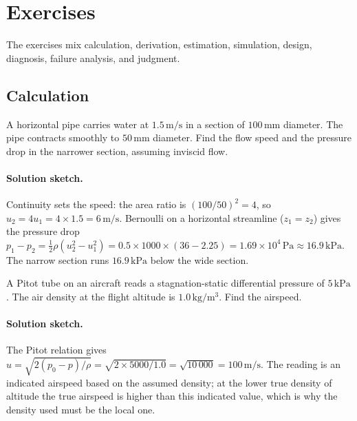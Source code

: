 \section{Exercises}

The exercises mix calculation, derivation, estimation, simulation,
design, diagnosis, failure analysis, and judgment.

\subsection*{Calculation}

\begin{exercise}
A horizontal pipe carries water at $1.5\,\si{\meter\per\second}$ in
a section of $100\,\si{\milli\meter}$ diameter. The pipe contracts
smoothly to $50\,\si{\milli\meter}$ diameter. Find the flow speed
and the pressure drop in the narrower section, assuming inviscid
flow.

\paragraph{Solution sketch.} Continuity sets the speed: the area
ratio is $(100/50)^2 = 4$, so $u_2 = 4 u_1 = 4\times 1.5 =
6\,\si{\meter\per\second}$. Bernoulli on a horizontal streamline
($z_1 = z_2$) gives the pressure drop $p_1 - p_2 = \tfrac12\rho(u_2^2
- u_1^2) = 0.5\times 1000\times(36 - 2.25) = 1.69\times
10^4\,\text{Pa} \approx 16.9\,\text{kPa}$. The narrow section runs
$16.9\,\text{kPa}$ below the wide section.
\end{exercise}

\begin{exercise}
A Pitot tube on an aircraft reads a stagnation-static differential
pressure of $5\,\text{kPa}$. The air density at the flight
altitude is $1.0\,\si{\kilogram\per\meter\cubed}$. Find the
airspeed.

\paragraph{Solution sketch.} The Pitot relation gives $u =
\sqrt{2(p_0 - p)/\rho} = \sqrt{2\times 5000/1.0} = \sqrt{10\,000} =
100\,\si{\meter\per\second}$. The reading is an indicated airspeed
based on the assumed density; at the lower true density of altitude
the true airspeed is higher than this indicated value, which is why
the density used must be the local one.
\end{exercise}

